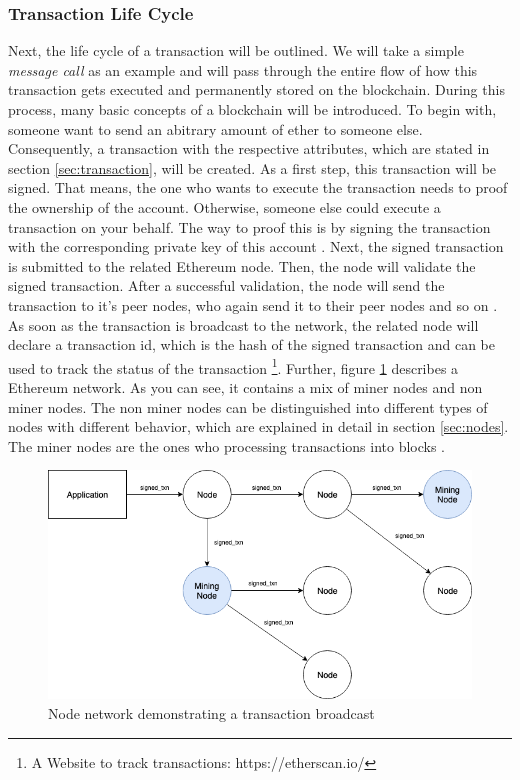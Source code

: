\subsubsection{Transaction Life Cycle}
\label{sec:transaction_lifecycle}
Next, the life cycle of a transaction will be outlined. We will take a simple \textit{message call} as an example and will pass through the entire flow of how this transaction gets executed and permanently stored on the blockchain. During this process, many basic concepts of a blockchain will be introduced. 
To begin with, someone want to send an abitrary amount of ether to someone else. Consequently, a transaction with the respective attributes, which are stated in section \ref{sec:transaction}, will be created. As a first step, this transaction will be signed. That means, the one who wants to execute the transaction needs to proof the ownership of the account. Otherwise, someone else could execute a transaction on your behalf. The way to proof this is by signing the transaction with the corresponding private key of this account . 
Next, the signed transaction is submitted to the related Ethereum node. Then, the node will validate the signed transaction. After a successful validation, the node will send the transaction to it's peer nodes, who again send it to their peer nodes and so on . As soon as the transaction is broadcast to the network, the related node will declare a transaction id, which is the hash of the signed transaction and can be used to track the status of the transaction \footnote{A Website to track transactions: https://etherscan.io/}. Further, figure \ref{figure:node_network} describes a Ethereum network. As you can see, it contains a mix of miner nodes and non miner nodes. The non miner nodes can be distinguished into different types of nodes with different behavior, which are explained in detail in section \ref{sec:nodes}. The miner nodes are the ones who processing transactions into blocks . 

\begin{figure}[htbp]
	\centering
	\includegraphics[width=.9\linewidth]{./figures/node_network.png}
	\caption{Node network demonstrating a transaction broadcast}
	\label{figure:node_network}
\end{figure}

